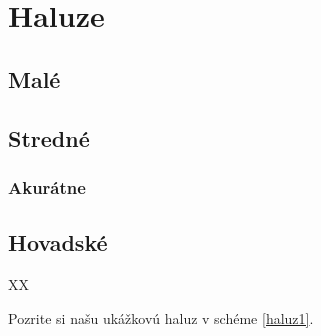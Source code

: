 \chapter{Haluze}

\section{Malé}

\section{Stredné}

\subsection{Akurátne}

\section{Hovadské}

\begin{schema}
\caption{XX}
\label{haluz1}
\end{schema}

Pozrite si našu ukážkovú haluz v schéme \ref{haluz1}.

